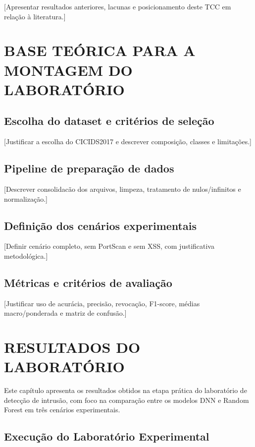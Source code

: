 \documentclass[12pt,oneside]{abntex2}
\begin{document}
[Apresentar resultados anteriores, lacunas e posicionamento deste TCC em relação à literatura.]

\chapter{BASE TEÓRICA PARA A MONTAGEM DO LABORATÓRIO}

\section{Escolha do dataset e critérios de seleção}

[Justificar a escolha do CICIDS2017 e descrever composição, classes e limitações.]

\section{Pipeline de preparação de dados}

[Descrever consolidacão dos arquivos, limpeza, tratamento de nulos/infinitos e normalização.]

\section{Definição dos cenários experimentais}

[Definir cenário completo, sem PortScan e sem XSS, com justificativa metodológica.]

\section{Métricas e critérios de avaliação}

[Justificar uso de acurácia, precisão, revocação, F1-score, médias macro/ponderada e matriz de confusão.]

\chapter{RESULTADOS DO LABORATÓRIO}

Este capítulo apresenta os resultados obtidos na etapa prática do laboratório de detecção de intrusão, com foco na comparação entre os modelos DNN e Random Forest em três cenários experimentais. 

\section{Execução do Laboratório Experimental}
\end{document}
